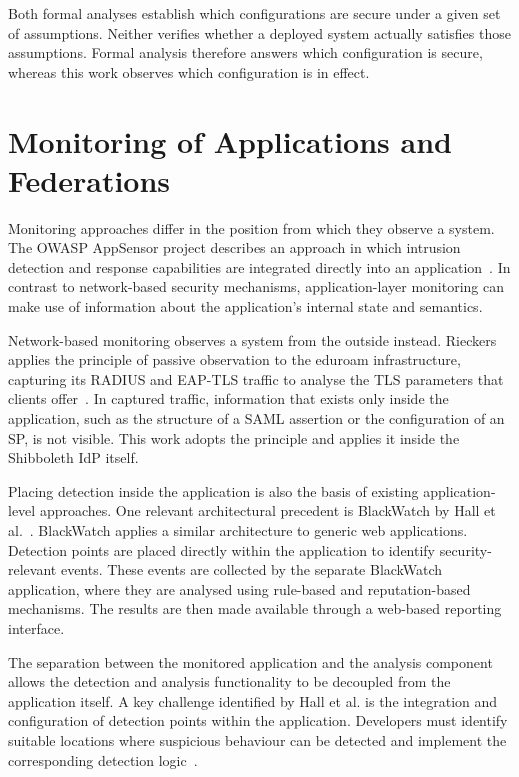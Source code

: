 \documentclass[../main.tex]{subfiles}
\begin{document}
Both formal analyses establish which configurations are secure under a given set of assumptions. 
Neither verifies whether a deployed system actually satisfies those assumptions. 
Formal analysis therefore answers which configuration is secure, whereas this work observes 
which configuration is in effect.

\section{Monitoring of Applications and Federations}\label{sec:app-detection}

Monitoring approaches differ in the position from which they observe a system. 
The OWASP AppSensor project describes an approach in which intrusion detection and response 
capabilities are integrated directly into an application~\cite{OWASPAppSensor}. 
In contrast to network-based security mechanisms, application-layer monitoring can make use of 
information about the application's internal state and semantics.

Network-based monitoring observes a system from the outside instead. 
Rieckers applies the principle of passive observation to the eduroam infrastructure, capturing its 
RADIUS and EAP-TLS traffic to analyse the TLS parameters that clients offer~\cite{EAPeduroam}. 
In captured traffic, information that exists only inside the application, such as the structure 
of a SAML assertion or the configuration of an SP, is not visible. 
This work adopts the principle and applies it inside the Shibboleth IdP itself. 

Placing detection inside the application is also the basis of existing application-level 
approaches. 
One relevant architectural precedent is BlackWatch by Hall et al.~\cite{BlackWatch}. 
BlackWatch applies a similar architecture to generic web applications. 
Detection points are placed directly within the application to identify security-relevant events. 
These events are collected by the separate BlackWatch application, where they are analysed using 
rule-based and reputation-based mechanisms. 
The results are then made available through a web-based reporting interface.

The separation between the monitored application and the analysis component allows the detection 
and analysis functionality to be decoupled from the application itself. 
A key challenge identified by Hall et al. is the integration and configuration of detection 
points within the application. 
Developers must identify suitable locations where suspicious behaviour can be detected and 
implement the corresponding detection logic~\cite{BlackWatch}. 
\end{document}

